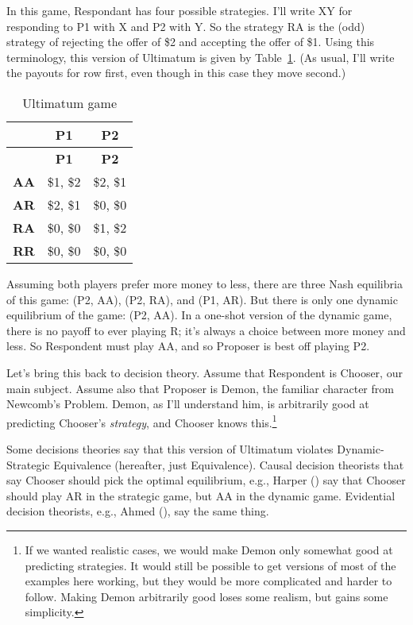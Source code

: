 \documentclass[
  10pt,
  letterpaper,
  DIV=11,
  numbers=noendperiod,
  twoside]{scrartcl}
\begin{document}
In this game, Respondant has four possible strategies. I'll write XY for
responding to P1 with X and P2 with Y. So the strategy RA is the (odd)
strategy of rejecting the offer of \$2 and accepting the offer of \$1.
Using this terminology, this version of Ultimatum is given by
Table~\ref{tbl-ultimatum}. (As usual, I'll write the payouts for row
first, even though in this case they move second.)

\begin{longtable}[]{@{}rcc@{}}
\caption{Ultimatum game}\label{tbl-ultimatum}\tabularnewline
\toprule\noalign{}
& \textbf{P1} & \textbf{P2} \\
\midrule\noalign{}
\endfirsthead
\toprule\noalign{}
& \textbf{P1} & \textbf{P2} \\
\midrule\noalign{}
\endhead
\bottomrule\noalign{}
\endlastfoot
\textbf{AA} & \$1, \$2 & \$2, \$1 \\
\textbf{AR} & \$2, \$1 & \$0, \$0 \\
\textbf{RA} & \$0, \$0 & \$1, \$2 \\
\textbf{RR} & \$0, \$0 & \$0, \$0 \\
\end{longtable}

Assuming both players prefer more money to less, there are three Nash
equilibria of this game: (P2, AA), (P2, RA), and (P1, AR). But there is
only one dynamic equilibrium of the game: (P2, AA). In a one-shot
version of the dynamic game, there is no payoff to ever playing R; it's
always a choice between more money and less. So Respondent must play AA,
and so Proposer is best off playing P2.

Let's bring this back to decision theory. Assume that Respondent is
Chooser, our main subject. Assume also that Proposer is Demon, the
familiar character from Newcomb's Problem. Demon, as I'll understand
him, is arbitrarily good at predicting Chooser's \emph{strategy}, and
Chooser knows this.\footnote{If we wanted realistic cases, we would make
  Demon only somewhat good at predicting strategies. It would still be
  possible to get versions of most of the examples here working, but
  they would be more complicated and harder to follow. Making Demon
  arbitrarily good loses some realism, but gains some simplicity.}

Some decisions theories say that this version of Ultimatum violates
Dynamic-Strategic Equivalence (hereafter, just Equivalence). Causal
decision theorists that say Chooser should pick the optimal equilibrium,
e.g., Harper () say that Chooser should
play AR in the strategic game, but AA in the dynamic game. Evidential
decision theorists, e.g., Ahmed (), say
the same thing.
\end{document}
